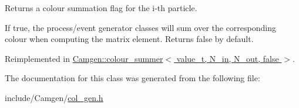 Returns a colour summation flag for the i-\/th particle. 

If true, the process/event generator classes will sum over the corresponding colour when computing the matrix element. Returns false by default. 

Reimplemented in \hyperlink{a00088_a1ab8045a6f4f9254f00de85c7d6e6e46}{Camgen\+::colour\+\_\+summer$<$ value\+\_\+t, N\+\_\+in, N\+\_\+out, false $>$}.



The documentation for this class was generated from the following file\+:\begin{DoxyCompactItemize}
\item 
include/\+Camgen/\hyperlink{a00612}{col\+\_\+gen.\+h}\end{DoxyCompactItemize}
